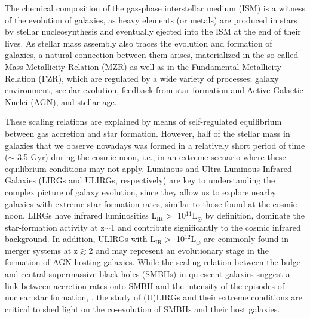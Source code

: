 \documentclass{nature2}
\begin{document}
The chemical composition of the gas-phase interstellar medium (ISM) is a witness of the evolution of galaxies, as heavy elements (or metals) are produced in stars by stellar nucleosynthesis and eventually ejected into the ISM at the end of their lives\cite{Nomoto_2013}. As stellar mass assembly also traces the evolution and formation of galaxies, a natural connection between them arises, materialized in the so-called Mass-Metallicity Relation (MZR)\cite{Lequeux_1979, Tremonti_2004, Andrews_Martini_2013, Perez-Montero_2016} as well as in the Fundamental Metallicity Relation (FZR)\cite{Mannucci_2010, Curti_2020}, which are regulated by a wide variety of processes: galaxy environment\cite{Peng_Maiolino_2014}, secular evolution\cite{Somerville_Dave_2015}, feedback from star-formation\cite{Blanc_2019} and Active Galactic Nuclei (AGN)\cite{Thomas_2019}, and stellar age\cite{Duarte-Puertas_2022}.

These scaling relations are explained by means of self-regulated equilibrium between gas accretion and star formation\cite{Maiolino_Mannucci_2019}. However, half of the stellar mass in galaxies that we observe nowadays was formed in a relatively short period of time (\ensuremath{\sim } 3.5 Gyr) during the cosmic noon\cite{Forster_Wuyts_2020}, i.e., in an extreme scenario where these equilibrium conditions may not apply. Luminous and Ultra-Luminous Infrared Galaxies (LIRGs and ULIRGs, respectively) are key to understanding the complex picture of galaxy evolution, since they allow us to explore nearby galaxies with extreme star formation rates, similar to those found at the cosmic noon\cite{Armus_2009}. LIRGs have infrared luminosities L\ensuremath{_{\mathrm{IR}}>} 10\ensuremath{^{11}}L\ensuremath{_\odot} by definition, dominate the star-formation activity at z\ensuremath{\sim}1 and contribute significantly to the cosmic infrared background\cite{Stierwalt_2013}. In addition, ULIRGs with L\ensuremath{_{\mathrm{IR}}>} 10\ensuremath{^{12}}L\ensuremath{_\odot} are commonly found in merger systems at z\ensuremath{\gtrsim}2 and may represent an evolutionary stage in the formation of AGN-hosting galaxies\cite{Sanders_1988, Evans_2005}. While the scaling relation between the bulge and central supermassive black holes (SMBHs) in quiescent galaxies suggest a link between accretion rates onto SMBH and the intensity of the episodes of nuclear star formation, \cite{Gebhardt_2000, Magnelli_2009}, the study of (U)LIRGs and their extreme conditions are critical to shed light on the co-evolution of SMBHs and their host galaxies.
\end{document}
